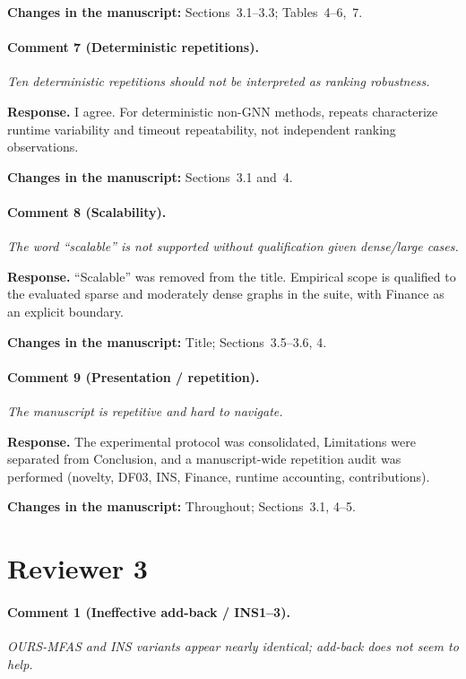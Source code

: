 \documentclass[11pt]{article}
\newcommand{\commentbox}[1]{\par\textit{#1}\par\medskip}
\newcommand{\changes}[1]{\textbf{Changes in the manuscript:} #1\par\medskip}
\begin{document}
\changes{Sections~3.1--3.3; Tables~4--6,~7.}

\paragraph{Comment 7 (Deterministic repetitions).}
\commentbox{Ten deterministic repetitions should not be interpreted as ranking robustness.}

\noindent\textbf{Response.}
I agree. For deterministic non-GNN methods, repeats characterize runtime variability and timeout repeatability, not independent ranking observations.

\changes{Sections~3.1 and~4.}

\paragraph{Comment 8 (Scalability).}
\commentbox{The word ``scalable'' is not supported without qualification given dense/large cases.}

\noindent\textbf{Response.}
``Scalable'' was removed from the title. Empirical scope is qualified to the evaluated sparse and moderately dense graphs in the suite, with Finance as an explicit boundary.

\changes{Title; Sections~3.5--3.6, 4.}

\paragraph{Comment 9 (Presentation / repetition).}
\commentbox{The manuscript is repetitive and hard to navigate.}

\noindent\textbf{Response.}
The experimental protocol was consolidated, Limitations were separated from Conclusion, and a manuscript-wide repetition audit was performed (novelty, DF03, INS, Finance, runtime accounting, contributions).

\changes{Throughout; Sections~3.1, 4--5.}

\section*{Reviewer 3}

\paragraph{Comment 1 (Ineffective add-back / INS1--3).}
\commentbox{OURS-MFAS and INS variants appear nearly identical; add-back does not seem to help.}
\end{document}
